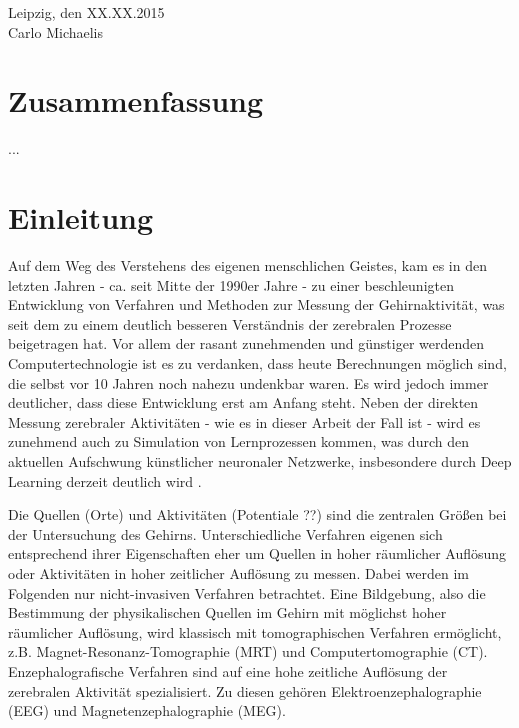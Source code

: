 \documentclass[doc,a4paper,12pt]{apa6}
\begin{document}
\vspace{3em}
\noindent Leipzig, den XX.XX.2015\\ Carlo Michaelis

\newpage

\section*{Zusammenfassung}

...

\newpage

\setcounter{tocdepth}{2}
\tableofcontents
\newpage

\listoffigures
\newpage

\section{Einleitung}

Auf dem Weg des Verstehens des eigenen menschlichen Geistes, kam es in den letzten Jahren - ca. seit Mitte der 1990er Jahre - zu einer beschleunigten Entwicklung von Verfahren und Methoden zur Messung der Gehirnaktivität, was seit dem zu einem deutlich besseren Verständnis der zerebralen Prozesse beigetragen hat. Vor allem der rasant zunehmenden und günstiger werdenden Computertechnologie ist es zu verdanken, dass heute Berechnungen möglich sind, die selbst vor 10 Jahren noch nahezu undenkbar waren. Es wird jedoch immer deutlicher, dass diese Entwicklung erst am Anfang steht. Neben der direkten Messung zerebraler Aktivitäten - wie es in dieser Arbeit der Fall ist - wird es zunehmend auch zu Simulation von Lernprozessen kommen, was durch den aktuellen Aufschwung künstlicher neuronaler Netzwerke, insbesondere durch Deep Learning derzeit deutlich wird \parencite[z.B.][]{ciresan2012multi}.

Die Quellen (Orte) und Aktivitäten (Potentiale ??) sind die zentralen Größen bei der Untersuchung des Gehirns. Unterschiedliche Verfahren eigenen sich entsprechend ihrer Eigenschaften eher um Quellen in hoher räumlicher Auflösung oder Aktivitäten in hoher zeitlicher Auflösung zu messen. Dabei werden im Folgenden nur nicht-invasiven Verfahren betrachtet. Eine Bildgebung, also die Bestimmung der physikalischen Quellen im Gehirn mit möglichst hoher räumlicher Auflösung, wird klassisch mit tomographischen Verfahren ermöglicht, z.B. Magnet-Resonanz-Tomographie (MRT) und Computertomographie (CT). Enzephalografische Verfahren sind auf eine hohe zeitliche Auflösung der zerebralen Aktivität spezialisiert. Zu diesen gehören Elektroenzephalographie (EEG) und Magnetenzephalographie (MEG).
\end{document}
